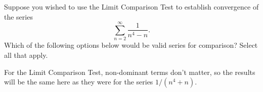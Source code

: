 \documentclass{ximera}
\begin{document}
\begin{exercise}
Suppose you wished to use the Limit Comparison Test to establish convergence of the series
\[ \sum_{n=2}^\infty \frac{1}{n^4 - n}. \]
Which of the following options below would be valid series for comparison? Select all that apply.
\begin{selectAll}
\end{selectAll}
\begin{feedback}
For the Limit Comparison Test, non-dominant terms don't matter, so the results will be the same here as they were for the series $1/(n^4+n)$.
\end{feedback}
\end{exercise}
\end{document}
